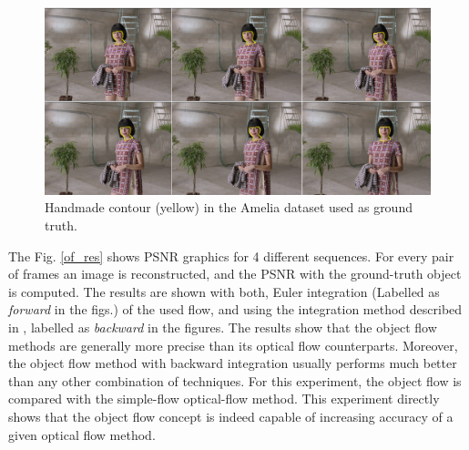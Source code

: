    \begin{figure}[thpb]
      \centering
      \includegraphics[width=1.0\textwidth]{../images/handmade_contour.png}
      \caption{Handmade contour (yellow) in the Amelia dataset used as ground truth.}
      \label{handmade}
   \end{figure}

The Fig. \ref{of_res} shows PSNR graphics for 4 different sequences. For every pair of frames an image is reconstructed, and the PSNR with the ground-truth object is computed.
The results are shown with both, Euler integration (Labelled as {\it forward} in the figs.) of the used flow, 
and using the integration method described in \cite{c20}, labelled as {\it backward} in the figures. The results show that the object flow methods are generally more precise than its optical flow 
counterparts. Moreover, the object flow method with backward integration usually performs much better than any other combination of techniques. For this experiment, the object flow is compared with the simple-flow optical-flow method. This experiment directly shows that the object flow concept is indeed capable of increasing accuracy of a given optical flow method. 

